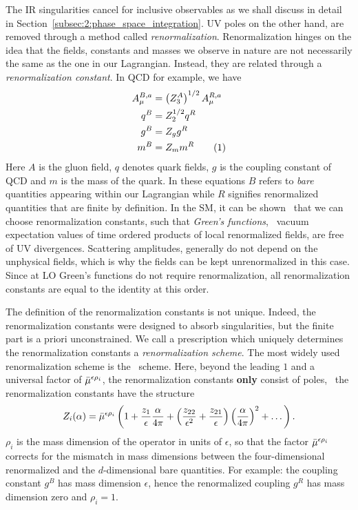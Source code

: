 The \acs{IR} singularities cancel for inclusive observables as we shall discuss in detail in Section~\ref{subsec:2:phase_space_integration}. \acs{UV} poles on the other hand, are removed through a method called \textit{renormalization}. Renormalization hinges on the idea that the fields, constants and masses we observe in nature are not necessarily the same as the one in our Lagrangian. Instead, they are related through a \textit{renormalization constant}. In \acs{QCD} for example, we have
\begin{align*}
A_\mu^{B,a} &= \left(Z_3^A \right)^{1/2} A_\mu^{R,a} \\
q^{B} &= Z_2^{1/2} q^R \\
g^B &= Z_g g^R \\
m^B &= Z_m m^R
\refstepcounter{equation}
\tag{\theequation} \label{eq:2:renormalization_QCD}
\end{align*}
Here $A$ is the gluon field, $q$ denotes quark fields, $g$ is the coupling constant of \acs{QCD} and $m$ is the mass of the quark. In these equations $B$ refers to \textit{bare} quantities appearing within our Lagrangian while $R$ signifies renormalized quantities that are finite by definition. In the \acs{SM}, it can be shown~\cite{tHooft:1971qjg,tHooft:1972tcz} that we can choose renormalization constants, such that \textit{Green's functions}, \ie\ vacuum expectation values of time ordered products of local renormalized fields, are free of \acs{UV} divergences. Scattering amplitudes, generally do not depend on the unphysical fields, which is why the fields can be kept unrenormalized in this case. Since at \acs{LO} Green's functions do not require renormalization, all renormalization constants are equal to the identity at this order.

The definition of the renormalization constants is not unique. Indeed, the renormalization constants were designed to absorb singularities, but the finite part is a priori unconstrained. We call a prescription which uniquely determines the renormalization constants a \textit{renormalization scheme}. The most widely used renormalization scheme is the \MS\ scheme. Here, beyond the leading $1$ and a universal factor of $\bar{\mu}^{\epsilon \rho_i}$, the renormalization constants \textbf{only} consist of poles, \ie\ the renormalization constants have the structure
\begin{equation}
Z_i(\alpha) = \bar{\mu}^{\epsilon \rho_i} \left(1 + \frac{z_1}{\epsilon} \frac{\alpha}{4 \pi} + \left(\frac{z_{22}}{\epsilon^2} + \frac{z_{21}}{\epsilon} \right) \left( \frac{\alpha}{4 \pi} \right)^2 + \dots \right).
\end{equation}
$\rho_i$ is the mass dimension of the operator in units of $\epsilon$, so that the factor $\bar{\mu}^{\epsilon \rho_i}$ corrects for the mismatch in mass dimensions between the four-dimensional renormalized and the $d$-dimensional bare quantities. For example: the coupling constant $g^B$ has mass dimension $\epsilon$, hence the renormalized coupling $g^R$ has mass dimension zero and $\rho_i = 1$.

